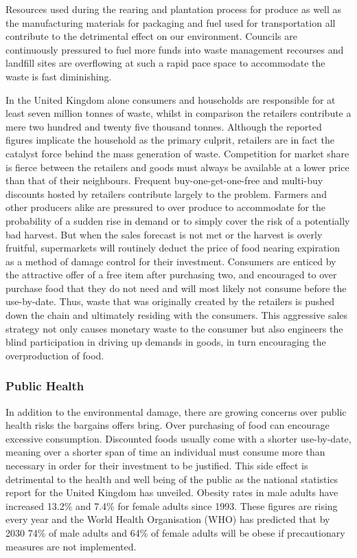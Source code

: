 \documentclass[a4paper, 11pt]{article}
\begin{document}
Resources used during the rearing and plantation process for produce as well as the manufacturing materials for packaging and fuel used for transportation all contribute to the detrimental effect on our environment. Councils are continuously pressured to fuel more funds into waste management recourses and landfill sites are overflowing at such a rapid pace space to accommodate the waste is fast diminishing.\cite{FoodWaste}

In the United Kingdom alone consumers and households are responsible for at least seven million tonnes of waste, whilst in comparison the retailers contribute a mere two hundred and twenty five thousand tonnes\cite{statistic}. Although the reported figures implicate the household as the primary culprit, retailers are in fact the catalyst force behind the mass generation of waste. Competition for market share is fierce between the retailers and goods must always be available at a lower price than that of their neighbours. Frequent buy-one-get-one-free and multi-buy discounts hosted by retailers contribute largely to the problem. Farmers and other producers alike are pressured to over produce to accommodate for the probability of a sudden rise in demand or to simply cover the risk of a potentially bad harvest. But when the sales forecast is not met or the harvest is overly fruitful, supermarkets will routinely deduct the price of food nearing expiration as a method of damage control for their investment. Consumers are enticed by the attractive offer of a free item after purchasing two, and encouraged to over purchase food that they do not need and will most likely not consume before the use-by-date. Thus, waste that was originally created by the retailers is pushed down the chain and ultimately residing with the consumers. This aggressive sales strategy not only causes monetary waste to the consumer but also engineers the blind participation in driving up demands in goods, in turn encouraging the overproduction of food. 


\subsubsection{Public Health}
In addition to the environmental damage, there are growing concerns over public health risks the bargains offers bring. Over purchasing of food can encourage excessive consumption. Discounted foods usually come with a shorter use-by-date, meaning over a shorter span of time an individual must consume more than necessary in order for their investment to be justified. This side effect is detrimental to the health and well being of the public as the national statistics report for the United Kingdom has unveiled. Obesity rates in male adults have increased 13.2\% and 7.4\% for female adults since 1993. These figures are rising every year and the World Health Organisation (WHO) has predicted that by 2030 74\% of male adults and 64\% of female adults will be obese if precautionary measures are not implemented.\cite{obesity} 
\end{document}
